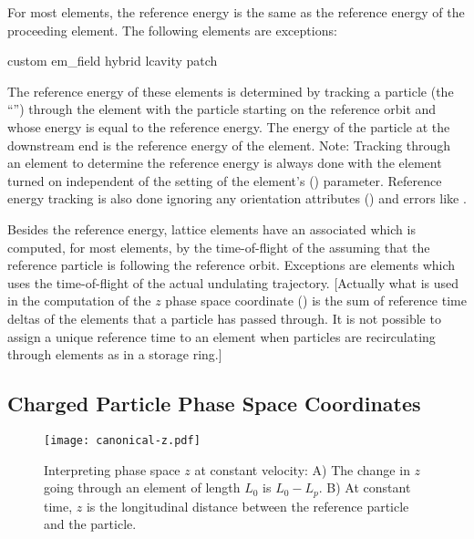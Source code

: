 For most elements, the reference energy is the same as the reference energy of the proceeding
element. The following elements are exceptions:
\begin{example}
  custom
  em_field
  hybrid
  lcavity
  patch
\end{example}
The reference energy of these elements is determined by tracking a particle (the ``'') through the element with the particle starting on the reference orbit and whose energy
is equal to the reference energy. The energy of the particle at the downstream end is the reference
energy of the element. Note: Tracking through an element to determine the reference energy is always
done with the element turned on independent of the setting of the element's 
() parameter. Reference energy tracking is also done ignoring any orientation attributes
() and errors like .

Besides the reference energy, lattice elements have an associated  which is
computed, for most elements, by the time-of-flight of the  assuming that the
reference particle is following the reference orbit. Exceptions are  elements which uses
the time-of-flight of the actual undulating trajectory. [Actually what is used in the computation of
the $z$ phase space coordinate () is the sum of reference time deltas of the elements that
a particle has passed through. It is not possible to assign a unique reference time to an element
when particles are recirculating through elements as in a storage ring.]

\subsection{Charged Particle Phase Space Coordinates}
\label{s:phase.space}

\begin{figure}
\centering \texttt{[image: canonical-z.pdf]} \caption[Interpreting phase space $z$ at constant
velocity.]  {Interpreting phase space $z$ at constant velocity: A) The change in $z$ going through
an element of length $L_0$ is $L_0 - L_p$.  B) At constant time, $z$ is the longitudinal distance
between the reference particle and the particle.}  \label{f:canonical.z}
\end{figure}

